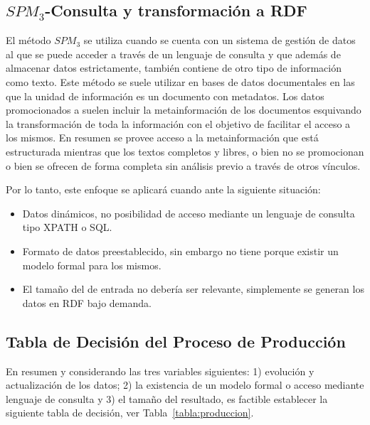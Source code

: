 \subsection{$SPM_3$-Consulta y transformación a RDF}
El método $SPM_3$ se utiliza cuando se cuenta con un sistema de gestión de datos al que se puede acceder 
a través de un lenguaje de consulta y que además de almacenar 
datos estrictamente, también contiene de otro tipo de información como texto. Este método se suele
utilizar en bases de datos documentales en las que la unidad de información es un 
documento con metadatos. Los datos promocionados a \linkeddata suelen incluir
la metainformación de los documentos esquivando la transformación de toda la información
con el objetivo de facilitar el acceso a los mismos. En resumen se provee acceso
a la metainformación que está estructurada mientras que los textos completos y libres, o bien no se promocionan o bien se ofrecen de forma completa 
sin análisis previo a través de otros vínculos.


Por lo tanto, este enfoque se aplicará cuando ante la siguiente situación:
\begin{itemize}
 \item Datos dinámicos, no posibilidad de acceso mediante un lenguaje de consulta tipo XPATH o SQL.
 \item Formato de datos preestablecido, sin embargo no tiene porque existir un modelo formal para los mismos.
 \item El tamaño del \dataset de entrada no debería ser relevante, simplemente se generan los datos en RDF bajo demanda.
\end{itemize}


\subsection{Tabla de Decisión del Proceso de Producción}
En resumen y considerando las tres variables siguientes: 1) evolución y actualización de los datos; 2) la existencia
de un modelo formal o acceso mediante lenguaje de consulta y 3) el tamaño del \dataset resultado, es factible establecer
la siguiente tabla de decisión, ver Tabla~\ref{tabla:produccion}.

\newpage

